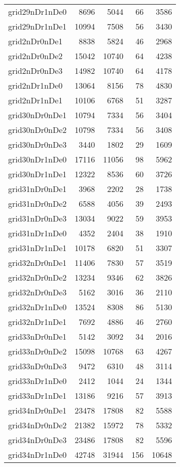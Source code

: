 \begin{tabular}{lrrrr}
grid29nDr1nDe0 & 8696 & 5044 & 66 & 3586 \\
grid29nDr1nDe1 & 10994 & 7508 & 56 & 3430 \\
grid2nDr0nDe1 & 8838 & 5824 & 46 & 2968 \\
grid2nDr0nDe2 & 15042 & 10740 & 64 & 4238 \\
grid2nDr0nDe3 & 14982 & 10740 & 64 & 4178 \\
grid2nDr1nDe0 & 13064 & 8156 & 78 & 4830 \\
grid2nDr1nDe1 & 10106 & 6768 & 51 & 3287 \\
grid30nDr0nDe1 & 10794 & 7334 & 56 & 3404 \\
grid30nDr0nDe2 & 10798 & 7334 & 56 & 3408 \\
grid30nDr0nDe3 & 3440 & 1802 & 29 & 1609 \\
grid30nDr1nDe0 & 17116 & 11056 & 98 & 5962 \\
grid30nDr1nDe1 & 12322 & 8536 & 60 & 3726 \\
grid31nDr0nDe1 & 3968 & 2202 & 28 & 1738 \\
grid31nDr0nDe2 & 6588 & 4056 & 39 & 2493 \\
grid31nDr0nDe3 & 13034 & 9022 & 59 & 3953 \\
grid31nDr1nDe0 & 4352 & 2404 & 38 & 1910 \\
grid31nDr1nDe1 & 10178 & 6820 & 51 & 3307 \\
grid32nDr0nDe1 & 11406 & 7830 & 57 & 3519 \\
grid32nDr0nDe2 & 13234 & 9346 & 62 & 3826 \\
grid32nDr0nDe3 & 5162 & 3016 & 36 & 2110 \\
grid32nDr1nDe0 & 13524 & 8308 & 86 & 5130 \\
grid32nDr1nDe1 & 7692 & 4886 & 46 & 2760 \\
grid33nDr0nDe1 & 5142 & 3092 & 34 & 2016 \\
grid33nDr0nDe2 & 15098 & 10768 & 63 & 4267 \\
grid33nDr0nDe3 & 9472 & 6310 & 48 & 3114 \\
grid33nDr1nDe0 & 2412 & 1044 & 24 & 1344 \\
grid33nDr1nDe1 & 13186 & 9216 & 57 & 3913 \\
grid34nDr0nDe1 & 23478 & 17808 & 82 & 5588 \\
grid34nDr0nDe2 & 21382 & 15972 & 78 & 5332 \\
grid34nDr0nDe3 & 23486 & 17808 & 82 & 5596 \\
grid34nDr1nDe0 & 42748 & 31944 & 156 & 10648 \\

\end{tabular}
